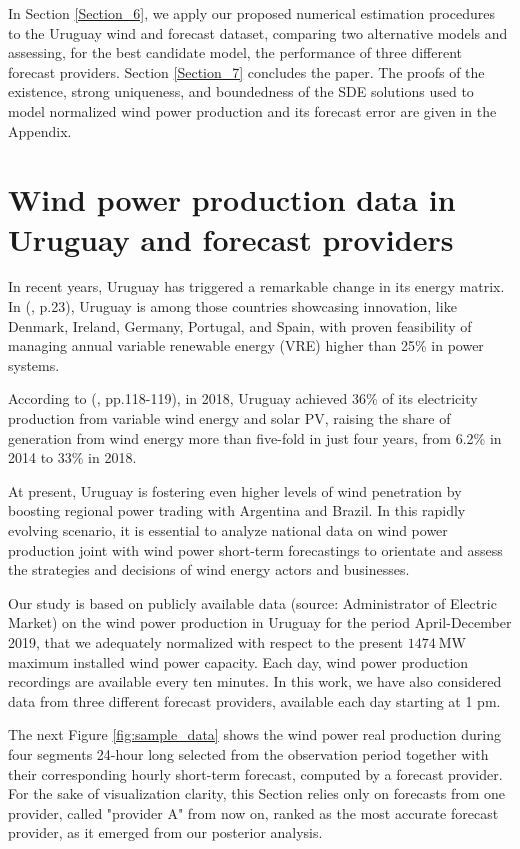 \documentclass[11pt]{article}
\theoremstyle{definition}
\begin{document}
In Section \ref{Section_6}, we apply our proposed numerical estimation procedures to the Uruguay wind and forecast dataset, comparing two alternative models and assessing, for the best candidate model, the performance of three different forecast providers. Section \ref{Section_7} concludes the paper. 
The proofs of the existence, strong uniqueness, and boundedness of the SDE solutions used to model normalized wind power production and its forecast error are given in the Appendix.



\section{Wind power production data in Uruguay and forecast providers } \label{Section_2}

In recent years, Uruguay has triggered a remarkable change in its energy matrix. In (\cite{irena}, p.23), Uruguay is among those countries showcasing innovation, like Denmark, Ireland, Germany, Portugal, and Spain, with proven feasibility of managing annual variable renewable energy (VRE) higher than 25\% in power systems. 

According to (\cite{ren21}, pp.118-119), in 2018, Uruguay achieved 36\% of its electricity production from variable wind energy and solar PV, raising the share of generation from wind energy more than five-fold in just four years, from 6.2\% in 2014 to 33\% in 2018. 

At present, Uruguay is fostering even higher levels of wind penetration by boosting regional power trading with Argentina and Brazil. 
In this rapidly evolving scenario, it is essential to analyze national data on wind power production joint with wind power short-term forecastings to orientate and assess the strategies and decisions of wind energy actors and businesses. 

Our study is based on publicly available data (source: Administrator of Electric Market) on the wind power production in Uruguay for the period April-December 2019, that we adequately normalized with respect to the present $\SI{1474}{\mega\watt}$ maximum installed wind power capacity. Each day, wind power production recordings are available every ten minutes.  In this work, we have also considered data from three different forecast providers, available each day starting at 1 pm.

The next Figure \ref{fig:sample_data} shows the wind power real production during four segments 24-hour long selected from the observation period together with their corresponding hourly short-term forecast, computed by a forecast provider. For the sake of visualization clarity, this Section relies only on forecasts from one provider, called "provider A" from now on, ranked as the most accurate forecast provider, as it emerged from our posterior analysis.
\end{document}
